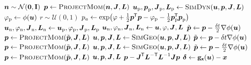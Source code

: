\begin{multicols}{2}
\small
\begin{algorithmic}
    \State $\vct{n} \sim \nrm{\vct{0},\mathbf{I}}$
    \State $\vct{p} \gets \Call{ProjectMom}{\vct{n},\mtx{J},\mtx{L}}$
    \State $\vct{u}_{\mathrm{p}},\vct{p}_{\mathrm{p}},\mtx{J}_{\mathrm{p}},\mtx{L}_{\mathrm{p}} \gets \Call{SimDyn}{\vct{u},\vct{p},\mtx{J},\mtx{L}}$
    \State $\varphi_{\mathrm{p}} \gets \phi(\boldsymbol{u})$
    \State $r \sim \mathcal{U}(0,1)$
    \State $p_a \gets \exp\lpa \varphi + \frac{1}{2}\vct{p}\tr\vct{p} - \varphi_{\mathrm{p}} - \frac{1}{2}\vct{p}_{\mathrm{p}}\tr\vct{p}_{\mathrm{p}} \rpa$
        \State $\boldsymbol{u}_{\mathrm{n}},\varphi_{\textrm{n}},\boldsymbol{J}_{\mathrm{n}},\boldsymbol{L}_{\mathrm{n}} 
        \gets \boldsymbol{u}_{\mathrm{p}},\varphi_{\mathrm{p}},\boldsymbol{J}_{\mathrm{p}},\boldsymbol{L}_{\mathrm{p}}$
    \Else
        \State $\boldsymbol{u}_{\mathrm{n}},\varphi_{\mathrm{n}},\boldsymbol{J}_{\mathrm{n}},\boldsymbol{L}_{\mathrm{n}} 
        \gets \boldsymbol{u},\varphi,\boldsymbol{J},\boldsymbol{L}$
    \EndIf
    \State %
        \State $\tilde{\boldsymbol{p}} \gets \boldsymbol{p} - \frac{\delta t}{2} \nabla\phi({\boldsymbol{u}})$
        \vspace{0.5mm}
        \State $\vct{p} \gets \Call{ProjectMom}{\tilde{\vct{p}},\mtx{J},\mtx{L}}$
        \State $\vct{u},\vct{p},\mtx{J},\mtx{L} \gets \Call{SimGeo}{\vct{u},\vct{p},\mtx{J},\mtx{L}}$
            \State $\tilde{\boldsymbol{p}} \gets \boldsymbol{p} - \delta t \nabla\phi({\boldsymbol{u}})$
            \vspace{0.5mm}
            \State $\vct{p} \gets \Call{ProjectMom}{\tilde{\vct{p}},\mtx{J},\mtx{L}}$
            \State $\vct{u},\vct{p},\mtx{J},\mtx{L} \gets \Call{SimGeo}{\vct{u},\vct{p},\mtx{J},\mtx{L}}$
        \EndFor
        \State $\tilde{\boldsymbol{p}}\gets \boldsymbol{p} - \frac{\delta t}{2} \nabla\phi({\boldsymbol{u}})$
        \vspace{0.5mm}
        \State $\vct{p} \gets \Call{ProjectMom}{\tilde{\vct{p}},\mtx{J},\mtx{L}}$
        \State \Return $\boldsymbol{u},\boldsymbol{p},\boldsymbol{J},\boldsymbol{L}$
    \EndFunction
    \State %
        \State \Return $\boldsymbol{p} - \boldsymbol{J}^{\mkern-1.5mu\mathsf{T}}\boldsymbol{L}^{-\textsf{T}}\boldsymbol{L}^{-1}\boldsymbol{J}\boldsymbol{p}$
    \EndFunction
    \columnbreak
         \State $\boldsymbol{\delta} \gets {\mathbf{g}}_{\boldsymbol{\mathsf{x}}}(\boldsymbol{u}) - \boldsymbol{x}$

\end{algorithmic}
\end{multicols}
